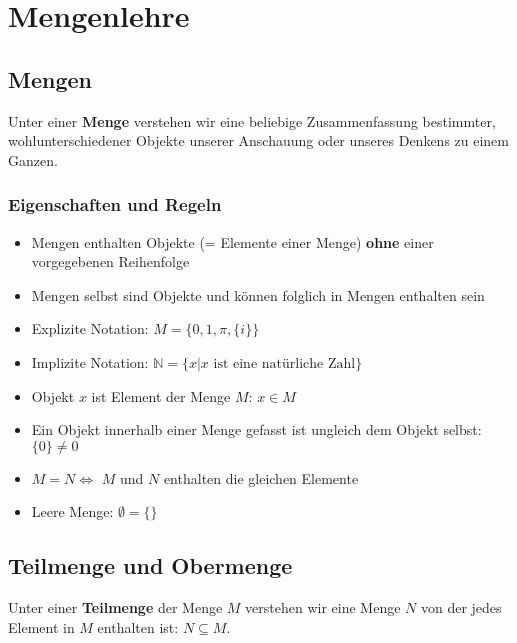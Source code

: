 \documentclass[../../main.tex]{subfiles}
\begin{document}
	\chapter{Mengenlehre}

	\section{Mengen}
	
	\begin{definition}[Menge]
		\label{def:Menge}
		Unter einer \textbf{Menge} verstehen wir eine beliebige Zusammenfassung bestimmter, wohlunterschiedener Objekte unserer Anschauung oder unseres Denkens zu einem Ganzen. 
	\end{definition}

	\subsection*{Eigenschaften und Regeln}
	\begin{itemize}
		\item Mengen enthalten Objekte (= Elemente einer Menge) \textbf{ohne} einer vorgegebenen Reihenfolge
		\item Mengen selbst sind Objekte und können folglich in Mengen enthalten sein
		\item Explizite Notation: $M = \{0, 1, \pi, \{i\}\}$
		\item Implizite Notation: $\mathbb{N} = \{x|x \textrm{ ist eine natürliche Zahl}\}$
		\item Objekt $x$ ist Element der Menge $M$: $x \in M$
		\item Ein Objekt innerhalb einer Menge gefasst ist ungleich dem Objekt selbst: $\{0\} \not= 0$
		\item $M = N \Leftrightarrow$ $M$ und $N$ enthalten die gleichen Elemente 
		\item Leere Menge: $\emptyset = \{\}$ 
	\end{itemize}



	\section{Teilmenge und Obermenge}

	\begin{definition}[Teilmenge]
		\label{def:Teilmenge}
		Unter einer \textbf{Teilmenge} der Menge $M$ verstehen wir eine Menge $N$ von der jedes Element in $M$ enthalten ist: $N \subseteq M$.
	\end{definition}
\end{document}
